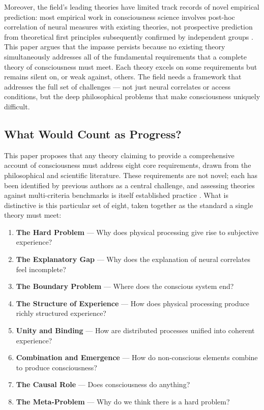 \documentclass[12pt]{article}
\begin{document}
Moreover, the field's leading theories have limited track records of novel empirical prediction: most empirical work in consciousness science involves post-hoc correlation of neural measures with existing theories, not prospective prediction from theoretical first principles subsequently confirmed by independent groups \citep{Yaron2022}. This paper argues that the impasse persists because no existing theory simultaneously addresses all of the fundamental requirements that a complete theory of consciousness must meet. Each theory excels on some requirements but remains silent on, or weak against, others. The field needs a framework that addresses the full set of challenges --- not just neural correlates or access conditions, but the deep philosophical problems that make consciousness uniquely difficult.


\subsection{What Would Count as Progress?}


This paper proposes that any theory claiming to provide a comprehensive account of consciousness must address eight core requirements, drawn from the philosophical and scientific literature. These requirements are not novel; each has been identified by previous authors as a central challenge, and assessing theories against multi-criteria benchmarks is itself established practice \citep{SethBayne2022}. What is distinctive is this particular set of eight, taken together as the standard a single theory must meet:

\begin{enumerate}
\item \textbf{The Hard Problem} \citep{Chalmers1995} --- Why does physical processing give rise to subjective experience?
\item \textbf{The Explanatory Gap} \citep{Levine1983} --- Why does the explanation of neural correlates feel incomplete?
\item \textbf{The Boundary Problem} \citep{Bayne2010,Tononi2004} --- Where does the conscious system end?
\item \textbf{The Structure of Experience} \citep{Nagel1974,Chalmers1996} --- How does physical processing produce richly structured experience?
\item \textbf{Unity and Binding} \citep{Treisman1980,Revonsuo1999} --- How are distributed processes unified into coherent experience?
\item \textbf{Combination and Emergence} \citep{Chalmers2016} --- How do non-conscious elements combine to produce consciousness?
\item \textbf{The Causal Role} \citep{Jackson1982} --- Does consciousness do anything?
\item \textbf{The Meta-Problem} \citep{Chalmers2018} --- Why do we think there is a hard problem?
\end{enumerate}
\end{document}
